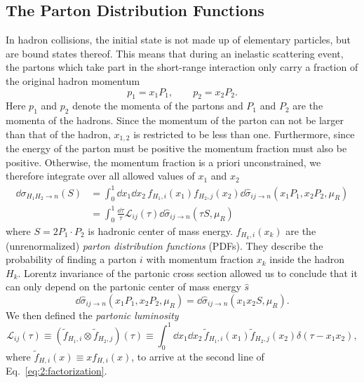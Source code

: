 \subsection{The Parton Distribution Functions}\label{subsec:PDFs}
In hadron collisions, the initial state is not made up of elementary particles, but are bound states thereof. This means that during an inelastic scattering event, the partons which take part in the short-range interaction only carry a fraction of the original hadron momentum
\begin{equation}
p_1 = x_1 P_1, \qquad p_2 = x_2 P_2.
\end{equation}
Here $p_1$ and $p_2$ denote the momenta of the partons and $P_1$ and $P_2$ are the momenta of the hadrons. Since the momentum of the parton can not be larger than that of the hadron, $x_{1,2}$ is restricted to be less than one. Furthermore, since the energy of the parton must be positive the momentum fraction must also be positive. Otherwise, the momentum fraction is a priori unconstrained, we therefore integrate over all allowed values of $x_1$ and $x_2$
\begin{equation}
\begin{split}
\dd \sigma_{H_1 H_2 \rightarrow n}(S) &=  \int_0^1 \dd x_1 \dd x_2 \, f_{H_1,i}(x_1) f_{H_2, j}(x_2) \dd \hat{\sigma}_{ij \rightarrow n}(x_1 P_1, x_2 P_2, \mu_R) \\
&= \int_0^1 \frac{\dd \tau}{\tau} \mathcal{L}_{ij}(\tau) \dd \hat{\sigma}_{ij \rightarrow n}\!\left(\tau S, \mu_R \right)
\end{split}
\label{eq:2:factorization}
\end{equation}
where $S =2 P_1 \cdot P_2$ is hadronic center of mass energy. $f_{H_{k}, i}(x_k)$ are the (unrenormalized) \textit{parton distribution functions} (\acs{PDF}s). They describe the probability of finding a parton $i$ with momentum fraction $x_k$ inside the hadron $H_k$. Lorentz invariance of the partonic cross section allowed us to conclude that it can only depend on the partonic center of mass energy $\hat{s}$
\begin{equation}
\dd \hat{\sigma}_{ij \rightarrow n} (x_1 P_1, x_2 P_2, \mu_R) = \dd \hat{\sigma}_{ij \rightarrow n}(x_1 x_2 S, \mu_R).
\end{equation}
We then defined the \textit{partonic luminosity}
\begin{equation}
\mathcal{L}_{ij}(\tau) \equiv  (\tilde{f}_{H_1,i} \otimes \tilde{f}_{H_2,j})(\tau) \equiv \int_0^1 \dd x_1 \dd x_2 \, \tilde{f}_{H_1,i}(x_1) \tilde{f}_{H_2, j}(x_2) \delta(\tau - x_1 x_2),
\end{equation}
where $\tilde{f}_{H, i}(x) \equiv x f_{H, i}(x)$, to arrive at the second line of Eq.~\eqref{eq:2:factorization}.

